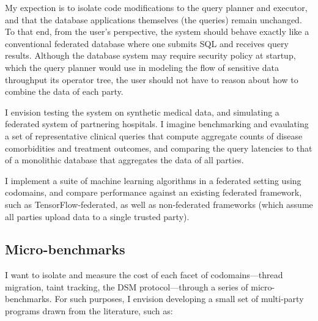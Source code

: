 My expection is to isolate code modifications to the query planner and
executor, and that the database
applications themselves (the queries) remain unchanged. 
%
To that end, from the user's perspective, the system should behave
exactly like a conventional federated database where one submits SQL and
receives query results. 
%
Although the database system may require security policy at startup, which the
query planner would use in modeling the flow of sensitive data throughput its
operator tree, the user should not have to reason about how to combine the data
of each party.


I envision testing the system on synthetic medical data, and simulating a
federated system of partnering hospitals.
%
I imagine benchmarking and evaulating a set of representative clinical queries
that compute aggregate counts of disease comorbidities and treatment outcomes,
and comparing the query latencies to that of a monolithic database that
aggregates the data of all parties.







%
I implement a suite of machine learning algorithms in a federated setting using
codomains, and compare performance against an existing federated framework,
such as TensorFlow-federated, as well as non-federated frameworks (which
assume all parties upload data to a single trusted party).


\subsection{Micro-benchmarks}

I want to isolate and measure the cost
of each facet of codomains---thread migration, taint tracking, the DSM
protocol---through a series of micro-benchmarks.
%
For such purposes, I envision developing a small set of multi-party programs
drawn from the literature, such as:


